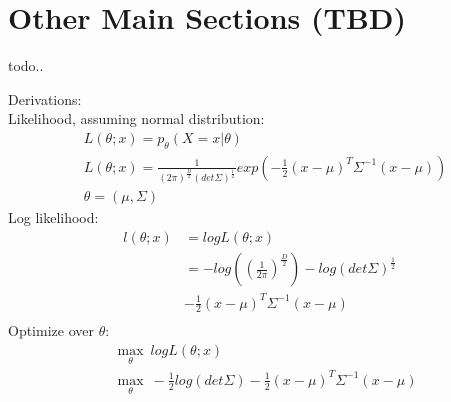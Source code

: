 \documentclass[10pt,conference]{IEEEtran}
\begin{document}
\section*{Other Main Sections (TBD)}
todo..\\

\vfill\null

\pagebreak

Derivations:\\
Likelihood, assuming normal distribution:
\begin{align*}
  &L(\theta;x) = p_{\theta}(X=x | \theta)\\
  &L(\theta;x) = \frac{1}{(2\pi)^{\frac{D}{2}} (det \Sigma)^{\frac{1}{2}}} exp(-\frac{1}{2}(x-\mu)^T\Sigma^{-1}(x-\mu))\\
  &\theta = (\mu,\Sigma)
\end{align*}
Log likelihood:
\begin{align*}
  l(\theta;x) & = log L(\theta;x)\\
              & = -log((\frac{1}{2 \pi})^{\frac{D}{2}}) - log(det \Sigma)^{\frac{1}{2}}\\
              & - \frac{1}{2}(x-\mu)^T \Sigma^{-1}(x-\mu)\\
\end{align*}
Optimize over $\theta$:
\begin{align*}
  & \max_{\theta}\ log L(\theta;x)\\
  & \max_{\theta}\ - \frac{1}{2} log(det \Sigma) - \frac{1}{2}(x-\mu)^T \Sigma^{-1}(x-\mu)
\end{align*}
\end{document}
